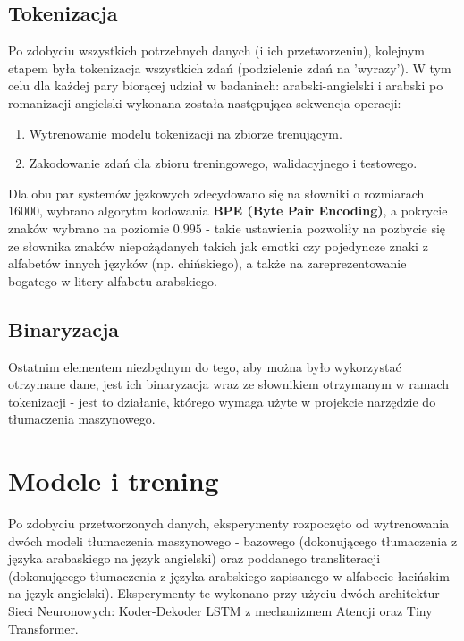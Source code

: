 \documentclass[
    left=2.5cm,         %
    right=2.5cm,        %
    top=2.5cm,          %
    bottom=3cm,         %
    bindingoffset=6mm,  %
    nohyphenation=false %
]{eiti/eiti-report}
\begin{document}
\subsection{Tokenizacja}
Po zdobyciu wszystkich potrzebnych danych (i ich przetworzeniu), kolejnym etapem była tokenizacja wszystkich zdań (podzielenie zdań na 'wyrazy'). W tym celu dla każdej pary biorącej udział w badaniach: arabski-angielski i arabski po romanizacji-angielski wykonana została następująca sekwencja operacji:
\begin{enumerate}
    \item Wytrenowanie modelu tokenizacji na zbiorze trenującym.
    \item Zakodowanie zdań dla zbioru treningowego, walidacyjnego i testowego. 
\end{enumerate}
Dla obu par systemów jęzkowych zdecydowano się na słowniki o rozmiarach $16000$, wybrano algorytm kodowania \textbf{BPE (Byte Pair Encoding)}, a pokrycie znaków wybrano na poziomie $0.995$ - takie ustawienia pozwoliły na pozbycie się ze słownika znaków niepożądanych takich jak emotki czy pojedyncze znaki z alfabetów innych języków (np. chińskiego), a także na zareprezentowanie bogatego w litery alfabetu arabskiego.

\subsection{Binaryzacja}
Ostatnim elementem niezbędnym do tego, aby można było wykorzystać otrzymane dane, jest ich binaryzacja wraz ze słownikiem otrzymanym w ramach tokenizacji - jest to działanie, którego wymaga użyte w projekcie narzędzie do tłumaczenia maszynowego.

\section{Modele i trening}
    Po zdobyciu przetworzonych danych, eksperymenty rozpoczęto od wytrenowania dwóch modeli tłumaczenia maszynowego - bazowego (dokonującego tłumaczenia z języka arabaskiego na język angielski) oraz poddanego transliteracji (dokonującego tłumaczenia z języka arabskiego zapisanego w alfabecie łacińskim na język angielski). Eksperymenty te wykonano przy użyciu dwóch architektur Sieci Neuronowych: Koder-Dekoder LSTM z mechanizmem Atencji oraz Tiny Transformer.
\end{document}
